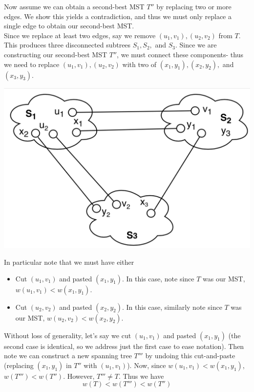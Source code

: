 \documentclass[paper=a4, fontsize=11pt]{scrartcl} %
\numberwithin{equation}{section} %
\numberwithin{figure}{section} %
\numberwithin{table}{section} %
\begin{document}
Now assume we can obtain a second-best MST $T''$ by replacing two or more edges. We show this yields a contradiction, and thus we must only replace a single edge to obtain our second-best MST. \\

Since we replace at least two edges, say we remove $(u_1, v_1), (u_2, v_2)$ from $T$. This produces three disconnected subtrees $S_1, S_2,$ and $S_3$. Since we are constructing our second-best MST $T''$, we must connect these components- thus we need to replace $(u_1, v_1), (u_2, v_2)$ with two of $(x_1, y_1), (x_2, y_2), $ and $(x_3, y_3)$.
\begin{center}
\includegraphics[scale=0.6]{figures/HW8-2breal.png}
\end{center}

In particular note that we must have either
\begin{itemize}
\item Cut $(u_1, v_1)$ and pasted $(x_1, y_1)$. In this case, note since $T$ was our MST, $w(u_1, v_1) < w(x_1, y_1)$. 
\item  Cut $(u_2, v_2)$ and pasted $(x_2, y_2)$. In this case, similarly note since $T$ was our MST, $w(u_2, v_2) < w(x_2, y_2)$. 
\end{itemize}

Without loss of generality, let's say we cut $(u_1, v_1)$ and pasted $(x_1, y_1)$ (the second case is identical, so we address just the first case to ease notation). Then note we can construct a new spanning tree $T'''$ by undoing this cut-and-paste (replacing $(x_1, y_1)$ in $T''$ with $(u_1, v_1)$). Now, since $w(u_1, v_1) < w(x_1, y_1)$, $w(T''') < w(T'')$. However, $T''' \ne T$. Thus we have
\[w(T) < w(T''') < w(T'')\]
\end{document}
